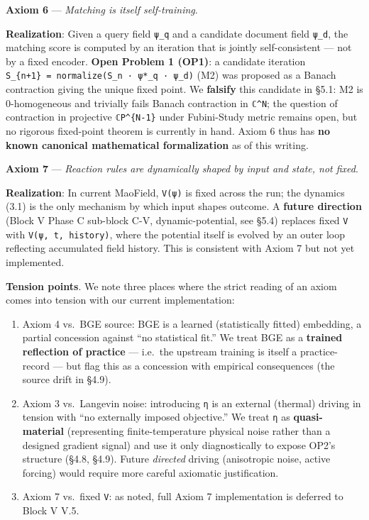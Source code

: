 \documentclass[
]{article}
\providecommand{\tightlist}{%
  \setlength{\itemsep}{0pt}\setlength{\parskip}{0pt}}
\begin{document}
\textbf{Axiom 6} --- \emph{Matching is itself self-training}.

\textbf{Realization}: Given a query field \texttt{ψ\_q} and a candidate
document field \texttt{ψ\_d}, the matching score is computed by an
iteration that is jointly self-consistent --- not by a fixed encoder.
\textbf{Open Problem 1 (OP1)}: a candidate iteration
\texttt{S\_\{n+1\}\ =\ normalize(S\_n\ ·\ ψ*\_q\ ·\ ψ\_d)} (M2) was
proposed as a Banach contraction giving the unique fixed point. We
\textbf{falsify} this candidate in §5.1: M2 is 0-homogeneous and
trivially fails Banach contraction in \texttt{ℂ\^{}N}; the question of
contraction in projective \texttt{ℂP\^{}\{N-1\}} under Fubini-Study
metric remains open, but no rigorous fixed-point theorem is currently in
hand. Axiom 6 thus has \textbf{no known canonical mathematical
formalization} as of this writing.

\textbf{Axiom 7} --- \emph{Reaction rules are dynamically shaped by
input and state, not fixed}.

\textbf{Realization}: In current MaoField, \texttt{V(ψ)} is fixed across
the run; the dynamics (3.1) is the only mechanism by which input shapes
outcome. A \textbf{future direction} (Block V Phase C sub-block C-V,
dynamic-potential, see §5.4) replaces fixed \texttt{V} with
\texttt{V(ψ,\ t,\ history)}, where the potential itself is evolved by an
outer loop reflecting accumulated field history. This is consistent with
Axiom 7 but not yet implemented.

\textbf{Tension points}. We note three places where the strict reading
of an axiom comes into tension with our current implementation:

\begin{enumerate}
\def\labelenumi{\arabic{enumi}.}
\tightlist
\item
  Axiom 4 vs.~BGE source: BGE is a learned (statistically fitted)
  embedding, a partial concession against ``no statistical fit.'' We
  treat BGE as a \textbf{trained reflection of practice} --- i.e.~the
  upstream training is itself a practice-record --- but flag this as a
  concession with empirical consequences (the source drift in §4.9).
\item
  Axiom 3 vs.~Langevin noise: introducing \texttt{η} is an external
  (thermal) driving in tension with ``no externally imposed objective.''
  We treat \texttt{η} as \textbf{quasi-material} (representing
  finite-temperature physical noise rather than a designed gradient
  signal) and use it only diagnostically to expose OP2's structure
  (§4.8, §4.9). Future \emph{directed} driving (anisotropic noise,
  active forcing) would require more careful axiomatic justification.
\item
  Axiom 7 vs.~fixed \texttt{V}: as noted, full Axiom 7 implementation is
  deferred to Block V V.5.
\end{enumerate}
\end{document}
